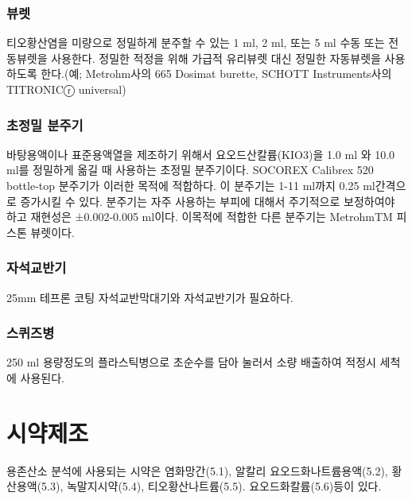 \documentclass[
]{book}
\begin{document}
\hypertarget{uxbdf0uxb81b}{%
\subsection{뷰렛}\label{uxbdf0uxb81b}}

티오황산염을 미량으로 정밀하게 분주할 수 있는 1 ml, 2 ml, 또는 5 ml 수동 또는 전동뷰렛을 사용한다. 정밀한 적정을 위해 가급적 유리뷰렛 대신 정밀한 자동뷰렛을 사용하도록 한다.(예; Metrohm사의 665 Dosimat burette, SCHOTT Instruments사의 TITRONICⓡ universal)

\hypertarget{uxcd08uxc815uxbc00-uxbd84uxc8fcuxae30}{%
\subsection{초정밀 분주기}\label{uxcd08uxc815uxbc00-uxbd84uxc8fcuxae30}}

바탕용액이나 표준용액열을 제조하기 위해서 요오드산칼륨(KIO3)을 1.0 ml 와 10.0 ml를 정밀하게 옮길 때 사용하는 초정밀 분주기이다. SOCOREX Calibrex 520 bottle-top 분주기가 이러한 목적에 적합하다. 이 분주기는 1-11 ml까지 0.25 ml간격으로 증가시킬 수 있다. 분주기는 자주 사용하는 부피에 대해서 주기적으로 보정하여야 하고 재현성은 ±0.002-0.005 ml이다. 이목적에 적합한 다른 분주기는 MetrohmTM 피스톤 뷰렛이다.

\hypertarget{uxc790uxc11duxad50uxbc18uxae30}{%
\subsection{자석교반기}\label{uxc790uxc11duxad50uxbc18uxae30}}

25mm 테프론 코팅 자석교반막대기와 자석교반기가 필요하다.

\hypertarget{uxc2a4uxd034uxc988uxbcd1}{%
\subsection{스퀴즈병}\label{uxc2a4uxd034uxc988uxbcd1}}

250 ml 용량정도의 플라스틱병으로 초순수를 담아 눌러서 소량 배출하여 적정시 세척에 사용된다.

\hypertarget{uxc2dcuxc57duxc81cuxc870}{%
\chapter{시약제조}\label{uxc2dcuxc57duxc81cuxc870}}

용존산소 분석에 사용되는 시약은 염화망간(5.1), 알칼리 요오드화나트륨용액(5.2), 황산용액(5.3), 녹말지시약(5.4), 티오황산나트륨(5.5). 요오드화칼륨(5.6)등이 있다.
\end{document}
